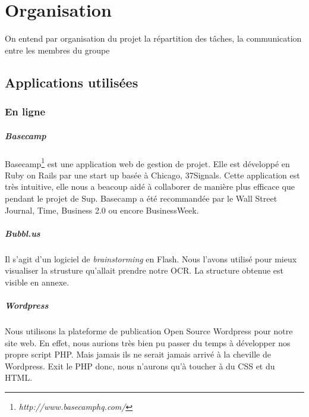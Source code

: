 \documentclass[]{report}
\begin{document}
\chapter{Organisation} %
\label{cha:organisation}
	On entend par organisation du projet la r\'epartition des t\^aches, la communication entre les membres du groupe
	\section{Applications utilis\'ees} %
	\label{sec:applications_utilis'ees}
		\subsection{En ligne} %
		\label{sub:en_ligne}
			\paragraph{Basecamp\\} %
			\label{par:basecamp}
			Basecamp\footnote{\emph{http://www.basecamphq.com/}} est une application web de gestion de projet. Elle est développ\'e en Ruby on Rails par une start up bas\'ee \`a Chicago, 37Signals. Cette application est tr\`es intuitive, elle nous a beacoup aid\'e \`a collaborer de mani\`ere plus efficace que pendant le projet de Sup. Basecamp a \'et\'e recommand\'ee par le Wall Street Journal, Time, Business 2.0 ou encore BusinessWeek.
			\paragraph{Bubbl.us\\} %
			\label{par:bubbl_us}
			Il s'agit d'un logiciel de \emph{brainstorming} en Flash. Nous l'avons utilis\'e pour mieux visualiser la strusture qu'allait prendre notre OCR. La structure obtenue est visible en annexe. %
			\paragraph{Wordpress\\} %
			\label{par:wordpress}
			Nous utilisons la plateforme de publication Open Source Wordpress pour notre site web. En effet, nous aurions tr\`es bien pu passer du temps \`a d\'evelopper nos propre script PHP. Mais jamais ils ne serait jamais arriv\'e \`a la cheville de Wordpress. Exit le PHP donc, nous n'aurons qu'\`a toucher \`a du CSS et du HTML.
\end{document}
